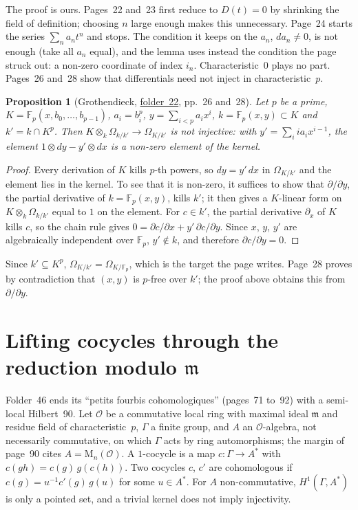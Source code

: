 \documentclass[11pt,a4paper]{amsart}
\newtheorem{proposition}[theorem]{Proposition}
\theoremstyle{definition}
\theoremstyle{remark}
\newcommand{\F}{\mathbb F}
\newcommand{\cO}{\mathcal O}
\newcommand{\fac}[1]{\href{https://grothendieck.umontpellier.fr/#1.pdf}{folder~#1}}
\begin{document}
The proof is ours. Pages~22 and~23 first reduce to $D(t) = 0$ by shrinking the field of definition; choosing $n$ large enough makes this unnecessary. Page~24 starts the series $\sum_n a_nt^n$ and stops. The condition it keeps on the $a_n$, $d a_n \ne 0$, is not enough (take all $a_n$ equal), and the lemma uses instead the condition the page struck out: a non-zero coordinate of index $i_n$. Characteristic~$0$ plays no part. Pages~26 and~28 show that differentials need not inject in characteristic~$p$.

\begin{proposition}[Grothendieck, \fac{22}, pp.~26 and~28]\label{prop:diff}
Let $p$ be a prime, $K = \F_p(x, b_0, \dots, b_{p-1})$, $a_i = b_i^p$, $y = \sum_{i<p} a_ix^i$, $k = \F_p(x, y) \subset K$ and $k' = k \cap K^p$. Then $K \otimes_k \Omega_{k/k'} \to \Omega_{K/k'}$ is not injective: with $y' = \sum_i ia_ix^{i-1}$, the element $1 \otimes dy - y' \otimes dx$ is a non-zero element of the kernel.
\end{proposition}

\begin{proof}
Every derivation of $K$ kills $p$-th powers, so $dy = y'\,dx$ in $\Omega_{K/k'}$ and the element lies in the kernel. To see that it is non-zero, it suffices to show that $\partial/\partial y$, the partial derivative of $k = \F_p(x, y)$, kills $k'$; it then gives a $K$-linear form on $K \otimes_k \Omega_{k/k'}$ equal to $1$ on the element. For $c \in k'$, the partial derivative $\partial_x$ of $K$ kills $c$, so the chain rule gives $0 = \partial c/\partial x + y'\,\partial c/\partial y$. Since $x$, $y$, $y'$ are algebraically independent over $\F_p$, $y' \notin k$, and therefore $\partial c/\partial y = 0$.
\end{proof}

Since $k' \subseteq K^p$, $\Omega_{K/k'} = \Omega_{K/\F_p}$, which is the target the page writes. Page~28 proves by contradiction that $(x, y)$ is $p$-free over $k'$; the proof above obtains this from $\partial/\partial y$.

\section{Lifting cocycles through the reduction modulo \texorpdfstring{$\mathfrak m$}{m}}\label{sec:coh}

Folder~46 ends its ``petits fourbis cohomologiques'' (pages~71 to~92) with a semi-local Hilbert~90. Let $\cO$ be a commutative local ring with maximal ideal $\mathfrak m$ and residue field of characteristic~$p$, $\Gamma$ a finite group, and $A$ an $\cO$-algebra, not necessarily commutative, on which $\Gamma$ acts by ring automorphisms; the margin of page~90 cites $A = \mathrm M_n(\cO)$. A $1$-cocycle is a map $c\colon\Gamma \to A^*$ with $c(gh) = c(g)\,g(c(h))$. Two cocycles $c$, $c'$ are cohomologous if $c(g) = u^{-1}c'(g)\,g(u)$ for some $u \in A^*$. For $A$ non-commutative, $H^1(\Gamma, A^*)$ is only a pointed set, and a trivial kernel does not imply injectivity.
\end{document}
